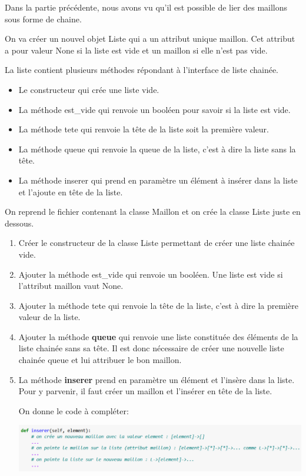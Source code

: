 \documentclass[11pt,a4paper]{article}
\begin{document}
Dans la partie précédente, nous avons vu qu'il est possible de lier des maillons sous forme de chaine. 

On va créer un nouvel objet \textsf{Liste} qui a un attribut unique \textsf{maillon}. Cet attribut a pour valeur \textsf{None} si la liste est vide et un maillon si elle n'est pas vide.

La liste contient plusieurs méthodes répondant à l'interface de liste chainée.

\begin{itemize}
\item Le constructeur qui crée une liste vide.
\item La méthode \textsf{est\_vide} qui renvoie un booléen pour savoir si la liste est vide.
\item La méthode \textsf{tete} qui renvoie la tête de la liste soit la première valeur.
\item La méthode \textsf{queue} qui renvoie la queue de la liste, c'est à dire la liste sans la tête.
\item La méthode \textsf{inserer} qui prend en paramètre un élément à insérer dans la liste et l'ajoute en tête de la liste.
\end{itemize}\medskip

On reprend le fichier contenant la classe \textsf{Maillon} et on crée la classe \textsf{Liste} juste en dessous.


\begin{enumerate}
\setlength{\itemsep}{6pt}
\item Créer le constructeur de la classe \textsf{Liste} permettant de créer une liste chainée vide. 

\item Ajouter la méthode \textsf{est\_vide} qui renvoie un booléen. Une liste est vide si l'attribut \textsf{maillon} vaut \textsf{None}.

\item Ajouter la méthode \textsf{tete} qui renvoie la tête de la liste, c'est à dire la première valeur de la liste. 

\item Ajouter la méthode \textbf{queue} qui renvoie une liste constituée des éléments de la liste chainée sans sa tête. Il est donc nécessaire de créer une nouvelle liste chainée \textsf{queue} et lui attribuer le bon maillon.

\item La méthode \textbf{inserer} prend en paramètre un élément et l'insère dans la liste. Pour y parvenir, il faut créer un maillon et l'insérer en tête de la liste.

On donne le code à compléter:

\begin{center}
\includegraphics[scale=0.8]{../img/poo_liste_inserer.png}
\end{center}


\end{enumerate}
\end{document}
